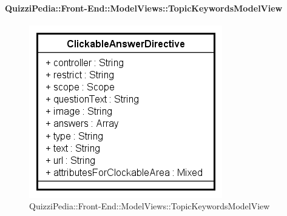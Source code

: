 \paragraph{QuizziPedia::Front-End::ModelViews::TopicKeywordsModelView}
				
				\label{QuizziPedia::Front-End::ModelViews::TopicKeywordsModelView}
				
				\begin{figure}[ht]
					\centering
					\includegraphics[scale=0.5,keepaspectratio]{UML/Classi/Front-End/QuizziPedia_Front-end_Templates_ClickableAnswerTemplate.png}
					\caption{QuizziPedia::Front-End::ModelViews::TopicKeywordsModelView}
				\end{figure} \FloatBarrier
				

